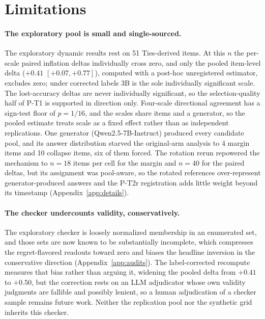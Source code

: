 \documentclass[11pt]{article}
\begin{document}
\FloatBarrier
\section{Limitations}

\paragraph{The exploratory pool is small and single-sourced.}
The exploratory dynamic results rest on 51 Ties-derived items.
At this $n$ the per-scale paired inflation deltas individually cross zero, and only the pooled item-level delta ($+0.41$ $[+0.07, +0.77]$), computed with a post-hoc unregistered estimator, excludes zero; under corrected labels 3B is the sole individually significant scale.
The lost-accuracy deltas are never individually significant, so the selection-quality half of P-T1 is supported in direction only.
Four-scale directional agreement has a sign-test floor of $p = 1/16$, and the scales share items and a generator, so the pooled estimate treats scale as a fixed effect rather than as independent replications.
One generator (Qwen2.5-7B-Instruct) produced every candidate pool, and its answer distribution starved the original-arm analysis to 4 margin items and 10 collapse items, six of them forced.
The rotation rerun repowered the mechanism to $n{=}18$ items per cell for the margin and $n{=}40$ for the paired deltas, but its assignment was pool-aware, so the rotated references over-represent generator-produced answers and the P-T2r registration adds little weight beyond its timestamp (Appendix~\ref{app:details}).

\paragraph{The checker undercounts validity, conservatively.}
The exploratory checker is loosely normalized membership in an enumerated set, and those sets are now known to be substantially incomplete, which compresses the regret-flavored readouts toward zero and biases the headline inversion in the conservative direction (Appendix~\ref{app:audits}).
The label-corrected recompute measures that bias rather than arguing it, widening the pooled delta from $+0.41$ to $+0.50$, but the correction rests on an LLM adjudicator whose own validity judgments are fallible and possibly lenient, so a human adjudication of a checker sample remains future work.
Neither the replication pool nor the synthetic grid inherits this checker.
\end{document}
